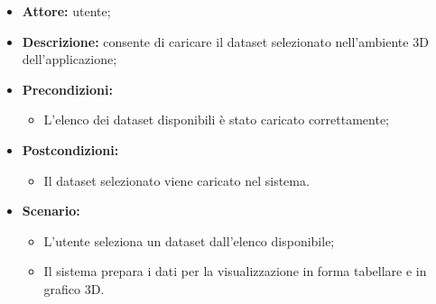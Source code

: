     \begin{itemize}
        \item \textbf{Attore:} utente;
        \item \textbf{Descrizione:} consente di caricare il dataset selezionato nell'ambiente 3D dell'applicazione;
        \item \textbf{Precondizioni:}
        \begin{itemize}
            \item L'elenco dei dataset disponibili è stato caricato correttamente;
        \end{itemize}
        \item \textbf{Postcondizioni:}
        \begin{itemize}
            \item Il dataset selezionato viene caricato nel sistema.
        \end{itemize}
        \item \textbf{Scenario:}
        \begin{itemize}
            \item L'utente seleziona un dataset dall'elenco disponibile;
            \item Il sistema prepara i dati per la visualizzazione in forma tabellare e in grafico 3D.
        \end{itemize}
    \end{itemize}
\newpage




